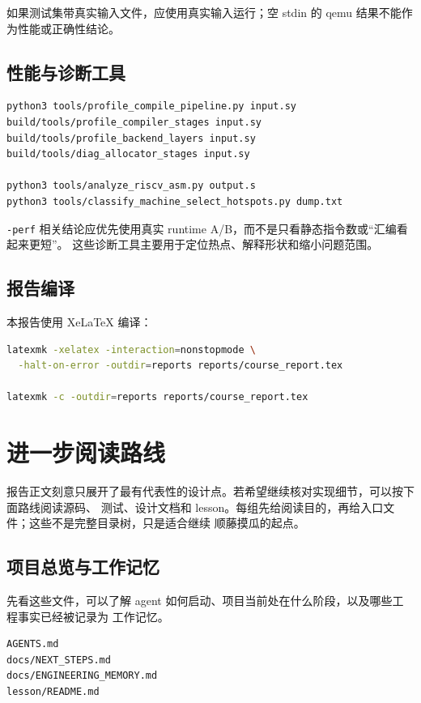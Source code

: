 \documentclass[UTF8,a4paper,11pt]{ctexart}
\begin{document}
如果测试集带真实输入文件，应使用真实输入运行；空 stdin 的 qemu 结果不能作为性能或正确性结论。

\subsection{性能与诊断工具}

\begin{lstlisting}[language=bash]
python3 tools/profile_compile_pipeline.py input.sy
build/tools/profile_compiler_stages input.sy
build/tools/profile_backend_layers input.sy
build/tools/diag_allocator_stages input.sy

python3 tools/analyze_riscv_asm.py output.s
python3 tools/classify_machine_select_hotspots.py dump.txt
\end{lstlisting}

\texttt{-perf} 相关结论应优先使用真实 runtime A/B，而不是只看静态指令数或“汇编看起来更短”。
这些诊断工具主要用于定位热点、解释形状和缩小问题范围。

\subsection{报告编译}

本报告使用 XeLaTeX 编译：

\begin{lstlisting}[language=bash]
latexmk -xelatex -interaction=nonstopmode \
  -halt-on-error -outdir=reports reports/course_report.tex

latexmk -c -outdir=reports reports/course_report.tex
\end{lstlisting}

\section{进一步阅读路线}

报告正文刻意只展开了最有代表性的设计点。若希望继续核对实现细节，可以按下面路线阅读源码、
测试、设计文档和 lesson。每组先给阅读目的，再给入口文件；这些不是完整目录树，只是适合继续
顺藤摸瓜的起点。

\subsection{项目总览与工作记忆}

先看这些文件，可以了解 agent 如何启动、项目当前处在什么阶段，以及哪些工程事实已经被记录为
工作记忆。

\begin{lstlisting}[language={}]
AGENTS.md
docs/NEXT_STEPS.md
docs/ENGINEERING_MEMORY.md
lesson/README.md
\end{lstlisting}
\end{document}
